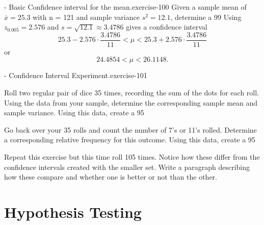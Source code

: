 \documentclass[10pt,]{book}
\numberwithin{equation}{section}
\newcommand{\lt}{<}
\begin{document}
 \begin{inlineexercise}{- Basic Confidence interval for the mean.}{exercise-100}%
\hypertarget{p-1425}{}%
Given a sample mean of \(\overline{x} = 25.3\) with n = 121 and sample variance \(s^2 = 12.1\), determine a 99%
\hypertarget{p-1426}{}%
Using \(z_{0.005} = 2.576\) and \(s = \sqrt{12.1} \approx 3.4786\) gives a confidence interval%
\begin{equation*}
25.3 - 2.576 \cdot \frac{3.4786}{11} \lt \mu \lt 25.3 + 2.576 \cdot \frac{3.4786}{11}
\end{equation*}
or%
\begin{equation*}
24.4854 \lt \mu \lt 26.1148.
\end{equation*}
%
%
\end{inlineexercise}
 \begin{inlineexercise}{- Confidence Interval Experiment.}{exercise-101}%
\hypertarget{p-1427}{}%
%
\end{inlineexercise}
 Roll two regular pair of dice 35 times, recording the sum of the dots for each roll.  Using the data from your sample, determine the corresponding sample mean and sample variance.  Using this data, create a 95%
\par
\hypertarget{p-1428}{}%
Go back over your 35 rolls and count the number of 7's or 11's rolled. Determine a corresponding relative frequency for this outcome. Using this data, create a 95%
\par
\hypertarget{p-1429}{}%
Repeat this exercise but this time roll 105 times.  Notice how these differ from the confidence intervals created with the smaller set.  Write a paragraph describing how these compare and whether one is better or not than the other.%
%
%
\typeout{************************************************}
\typeout{************************************************}
%
\chapter[{Hypothesis Testing}]{Hypothesis Testing}\label{HypothesisTesting}
%
%
\typeout{************************************************}
\typeout{************************************************}
%
\end{document}
